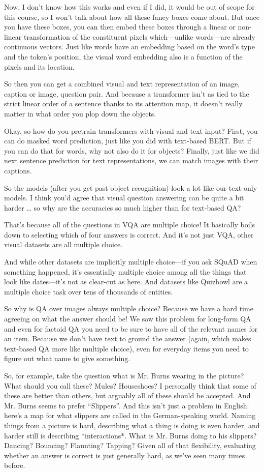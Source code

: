 Now, I don’t know how this works and even if I did, it would be out of scope for this course, so I won’t talk about how all these fancy boxes come about.  But once you have these boxes, you can then embed these boxes through a linear or non-linear transformation of the constituent pixels which—unlike words—are already continuous vectors.  Just like words have an embedding based on the word’s type and the token’s position, the visual word embedding also is a function of the pixels and its location.

So then you can get a combined visual and text representation of an image, caption or image, question pair.  And because a transformer isn’t as tied to the strict linear order of a sentence thanks to its attention map, it doesn’t really matter in what order you plop down the objects. 

Okay, so how do you pretrain transformers with visual and text input?  First, you can do masked word prediction, just like you did with text-based BERT.  But if you can do that for words, why not also do it for objects?  Finally, just like we did next sentence prediction for text representations, we can match images with their captions.  

So the models (after you get past object recognition) look a lot like our text-only models.  I think you’d agree that visual question answering can be quite a bit harder … so why are the accuracies so much higher than for text-based QA?

That’s because all of the questions in VQA are multiple choice!  It basically boils down to selecting which of four answers is correct.  And it’s not just VQA, other visual datasets are all multiple choice.  

And while other datasets are implicitly multiple choice—if you ask SQuAD when something happened, it’s essentially multiple choice among all the things that look like dates—it’s not as clear-cut as here.  And datasets like Quizbowl are a multiple choice task over tens of thousands of entities.  

So why is QA over images always multiple choice?  Because we have a hard time agreeing on what the answer should be!  We saw this problem for long-form QA and even for factoid QA you need to be sure to have all of the relevant names for an item.  Because we don’t have text to ground the answer (again, which makes text-based QA more like multiple choice), even for everyday items you need to figure out what name to give something. 

So, for example, take the question what is Mr. Burns wearing in the picture?  What should you call these?  Mules?  Houseshoes?  I personally think that some of these are better than others, but arguably all of these should be accepted.  And Mr. Burns seems to prefer “Slippers”.  And this isn’t just a problem in English: here’s a map for what slippers are called in the German-speaking world.  Naming things from a picture is hard, describing what a thing is doing is even harder, and harder still is describing *interactions*.  What is Mr. Burns doing to his slippers?  Dancing? Bouncing? Flaunting? Tapping?  Given all of that flexibility, evaluating whether an answer is correct is just generally hard, as we’ve seen many times before.

